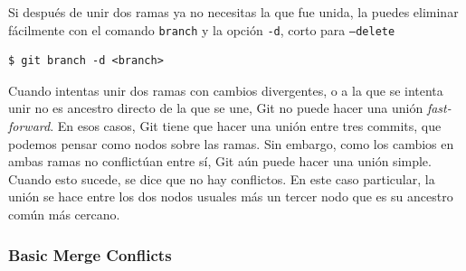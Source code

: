 \documentclass[spanish, 12pt, a4paper]{article}
\begin{document}
Si después de unir dos ramas ya no necesitas la que fue unida, la puedes eliminar fácilmente con el comando \texttt{branch} y la opción \texttt{-d}, corto para \texttt{--delete} 
\begin{lstlisting}
$ git branch -d <branch>
\end{lstlisting}

Cuando intentas unir dos ramas con cambios divergentes, o a la que se intenta unir no es ancestro directo de la que se une, Git no puede hacer una unión \textit{fast-forward}.
En esos casos, Git tiene que hacer una unión entre tres commits, que podemos pensar como nodos sobre las ramas.
Sin embargo, como los cambios en ambas ramas no conflictúan entre sí, Git aún puede hacer una unión simple.
Cuando esto sucede, se dice que no hay conflictos.
En este caso particular, la unión se hace entre los dos nodos usuales más un tercer nodo que es su ancestro común más cercano.

\subsubsection{Basic Merge Conflicts}
\end{document}
